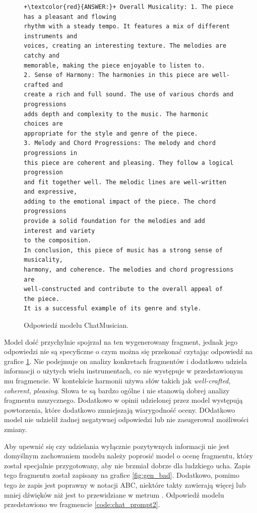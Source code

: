 \documentclass[data-science]{agh-wi} %
\begin{document}
\begin{figure}[ht!]
    \begin{verbatim}
+\textcolor{red}{ANSWER:}+ Overall Musicality: 1. The piece has a pleasant and flowing 
rhythm with a steady tempo. It features a mix of different instruments and
voices, creating an interesting texture. The melodies are catchy and 
memorable, making the piece enjoyable to listen to.
2. Sense of Harmony: The harmonies in this piece are well-crafted and 
create a rich and full sound. The use of various chords and progressions 
adds depth and complexity to the music. The harmonic choices are 
appropriate for the style and genre of the piece.
3. Melody and Chord Progressions: The melody and chord progressions in 
this piece are coherent and pleasing. They follow a logical progression 
and fit together well. The melodic lines are well-written and expressive, 
adding to the emotional impact of the piece. The chord progressions 
provide a solid foundation for the melodies and add interest and variety 
to the composition.
In conclusion, this piece of music has a strong sense of musicality, 
harmony, and coherence. The melodies and chord progressions are 
well-constructed and contribute to the overall appeal of the piece. 
It is a successful example of its genre and style.
    \end{verbatim}
    \caption{Odpowiedź modelu ChatMusician.}\label{code:chat_answer1}
\end{figure}

Model dość przychylnie spojrzał na ten wygenerowany fragment, jednak jego odpowiedzi nie są specyficzne o czym można się przekonać czytając odpowiedź na grafice \ref*{code:chat_answer1}. Nie podejmuje on analizy konkretach fragmentów i dodatkowo udziela informacji o użytych wielu instrumentach, co nie występuje w przedstawionym mu fragmencie. W kontekście harmonii używa słów takich jak \textit{well-crafted}, \textit{coherent}, \textit{pleasing}. Słowa te są bardzo ogólne i nie stanowią dobrej analizy fragmentu muzycznego. Dodatkowo w opinii udzielonej przez model występują powtorzenia, które dodatkowo zmniejszają wiarygodność oceny. DOdatkowo model nie udzielił żadnej negatywnej odpowiedzi lub nie zasugerował możliwości zmiany.

Aby upewnić się czy udzielania wyłącznie pozytywnych informacji nie jest domyślnym zachowaniem modelu należy poprosić model o ocenę fragmentu, który został specjalnie przygotowany, aby nie brzmiał dobrze dla ludzkiego ucha. Zapis tego fragmentu został zapisany na grafice \ref*{fig:gen_bad}. Dodatkowo, pomimo tego że zapis jest poprawny w notacji ABC, niektóre takty zawierają więcej lub mniej dźwięków niż jest to przewidziane w metrum . Odpowiedź modelu przedstawiono we fragmencie \ref*{code:chat_prompt2}.
\end{document}
